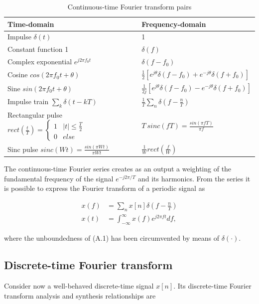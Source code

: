 \documentclass[a4paper, 12pt]{book}
\begin{document}
\begin{table}[h]
\centering
\caption{Continuous-time Fourier transform pairs}
\begin{tabular}{@{}ll@{}}
\toprule
\textbf{Time-domain} & \textbf{Frequency-domain} \\ \midrule
Impulse $\delta(t)$ & 1 \\
Constant function 1 & $\delta(f)$ \\
Complex exponential $e^{j2\pi f_{0}t}$ & $\delta(f-f_{0})$ \\
Cosine $cos(2\pi f_{0}t+\theta)$ & $\frac{1}{2}[e^{j\theta}\delta(f-f_{0})+e^{-j\theta}\delta(f+f_{0})]$ \\
Sine $sin(2\pi f_{0}t+\theta)$ & $\frac{1}{2j}[e^{j\theta}\delta(f-f_{0})-e^{-j\theta}\delta(f+f_{0})]$ \\
Impulse train $\sum_{k}\delta(t-kT)$ & $\frac{1}{T}\sum_{n}\delta(f-\frac{n}{T})$ \\
Rectangular pulse $rect(\frac{t}{T})=\begin{cases}1&|t|\le\frac{T}{2}\\ 0&else\end{cases}$ & $T~sinc(fT)=\frac{sin(\pi fT)}{\pi f}$ \\
Sinc pulse $sinc(Wt)=\frac{sin(\pi Wt)}{\pi Wt}$ & $\frac{1}{W}rect(\frac{f}{W})$ \\ \bottomrule
\end{tabular}
\end{table}

The continuous-time Fourier series creates as an output a weighting of the fundamental frequency of the signal $e^{-j2\pi/T}$ and its harmonics. From the series it is possible to express the Fourier transform of a periodic signal as

\begin{align}
    x(f) &= \sum_{n}x[n]\delta(f-\frac{n}{T}) \tag{A.5} \\
    x(t) &= \int_{-\infty}^{\infty}x(f)e^{j2\pi ft}df, \tag{A.6}
\end{align}

where the unboundedness of (A.1) has been circumvented by means of $\delta(\cdot)$.

\subsection{Discrete-time Fourier transform}

Consider now a well-behaved discrete-time signal $x[n]$. Its discrete-time Fourier transform analysis and synthesis relationships are
\end{document}
